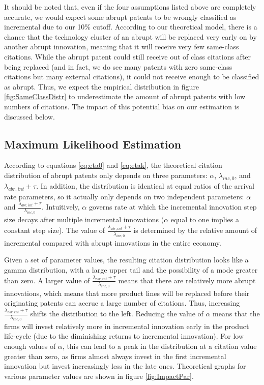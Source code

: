 \documentclass[letterpaper,12pt]{article}
\theoremstyle{definition}
\begin{document}
It should be noted that, even if the four assumptions listed above are completely accurate, we would expect some abrupt patents to be wrongly classified as incremental due to our 10\% cutoff. According to our theoretical model, there is a chance that the technology cluster of an abrupt will be replaced very early on by another abrupt innovation, meaning that it will receive very few same-class citations. While the abrupt patent could still receive out of class citations after being replaced (and in fact, we do see many patents with zero same-class citations but many external citations), it could not receive enough to be classified as abrupt. Thus, we expect the empirical distribution in figure \ref{fig:SameClassDistr} to underestimate the amount of abrupt patents with low numbers of citations. The impact of this potential bias on our estimation is discussed below.

\subsection{Maximum Likelihood Estimation}

According to equations \ref{eq:eta0} and \ref{eq:etak}, the theoretical citation distribution of abrupt patents only depends on three parameters: $\alpha$, $\lambda_{inc,0}$, and $\lambda_{abr, int} + \tau$. In addition, the distribution is identical at equal ratios of the arrival rate parameters, so it actually only depends on two independent parameters: $\alpha$ and $\frac{\lambda_{abr, int} + \tau}{\lambda_{inc,0}}$. Intuitively, $\alpha$ governs rate at which the incremental innovation step size decays after multiple incremental innovations ($\alpha$ equal to one implies a constant step size). The value of $\frac{\lambda_{abr, int} + \tau}{\lambda_{inc,0}}$ is determined by the relative amount of incremental compared with abrupt innovations in the entire economy.

Given a set of parameter values, the resulting citation distribution looks like a gamma distribution, with a large upper tail and the possibility of a mode greater than zero. A larger value of $\frac{\lambda_{abr, int} + \tau}{\lambda_{inc,0}}$  means that there are relatively more abrupt innovations, which means that more product lines will be replaced before their originating patents can accrue a large number of citations. Thus, increasing $\frac{\lambda_{abr, int} + \tau}{\lambda_{inc,0}}$ shifts the distribution to the left. Reducing the value of $\alpha$ means that the firms will invest relatively more in incremental innovation early in the product life-cycle (due to the diminishing returns to incremental innovation). For low enough values of $\alpha$, this can lead to a peak in the distribution at a citation value greater than zero, as firms almost always invest in the first incremental innovation but invest increasingly less in the late ones. Theoretical graphs for various parameter values are shown in figure \ref{fig:ImpactPar}.
\end{document}
